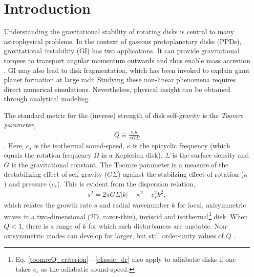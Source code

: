 \documentclass[iop, numberedappendix]{emulateapj}
\begin{document}
\section{Introduction}\label{intro} 
Understanding the gravitational stability of rotating disks    
is central to many astrophysical problems. In the context of 
gaseous protoplanetary disks (PPDs), gravitational instability (GI)
has two applications. It can provide gravitational torques to
transport angular momentum outwards and thus enable mass accretion
\citep{armitage10,turner14}. GI may also lead to disk fragmentation,
which has been invoked to explain giant planet formation at large
radii \citep{boss97,helled14} %
Studying these non-linear phenomena requires
direct numerical simulations. Nevertheless, physical insight can be    
obtained through analytical modeling. 

The standard metric for the (inverse) strength of disk self-gravity is
the \emph{Toomre parameter}, 
\begin{align}\label{toomreQ_criterion}
  Q \equiv \frac{c_s\kappa}{\pi G \Sigma}  
\end{align}
\citep{toomre64}. Here, $c_s$ is the isothermal sound-speed,
$\kappa$ is the epicyclic frequency (which equals the rotation
frequency $\Omega$ in a Keplerian disk), $\Sigma$ is the surface
density and $G$ is the gravitational constant. The Toomre parameter is a
measure of the destabilizing effect of self-gravity ($G\Sigma$) against 
the stabilzing effect of rotation ($\kappa$) and pressure 
($c_s$). This is evident from the dispersion relation, 
\begin{align}\label{classic_dr}
  s^2 =  2\pi G\Sigma|k| - \kappa^2 - c_s^2k^2,   
\end{align}
which relates the growth rate $s$ and radial wavenumber $k$ for local,
axisymmetric waves in a two-dimensional (2D, razor-thin), inviscid and
isothermal\footnote{Eq. \ref{toomreQ_criterion}---\ref{classic_dr} also apply to adiabatic disks if one takes $c_s$ as the adiabatic sound-speed.} disk.  
When $Q<1$, there is a range of $k$ for which such disturbances are
unstable.  
Non-axisymmetric modes can develop for larger, but still order-unity
values of $Q$ 
\citep{lau78,papaloizou89,papaloizou91}. 
\end{document}
